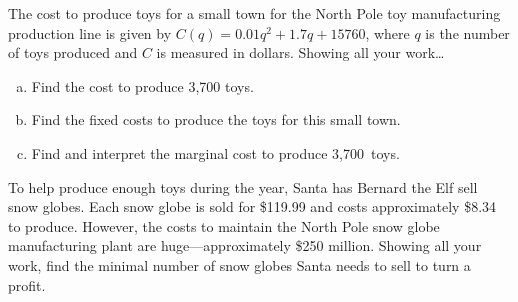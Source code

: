 \documentclass[12pt,letterpaper]{exam}
\begin{document}
\begin{questions}

\newpage
{} \par\vspace{0.3cm}

The cost to produce toys for a small town for the North Pole toy manufacturing production line is given by $C(q)= 0.01q^2 + 1.7q + 15760$, where $q$ is the number of toys produced and $C$ is measured in dollars. Showing all your work\dots
	\begin{enumerate}[(a)]
	\item Find the cost to produce 3,700 toys. \vfill
	\item Find the fixed costs to produce the toys for this small town. \vfill
	\item Find and interpret the marginal cost to produce 3,700~toys. \vfill
	\end{enumerate}



\newpage
{} \par\vspace{0.3cm}

To help produce enough toys during the year, Santa has Bernard the Elf sell snow globes. Each snow globe is sold for \$119.99 and costs approximately \$8.34 to produce. However, the costs to maintain the North Pole snow globe manufacturing plant are huge---approximately \$250 million. Showing all your work, find the minimal number of snow globes Santa needs to sell to turn a profit. 



\newpage
{} \par\vspace{0.3cm}


\end{questions}
\end{document}
